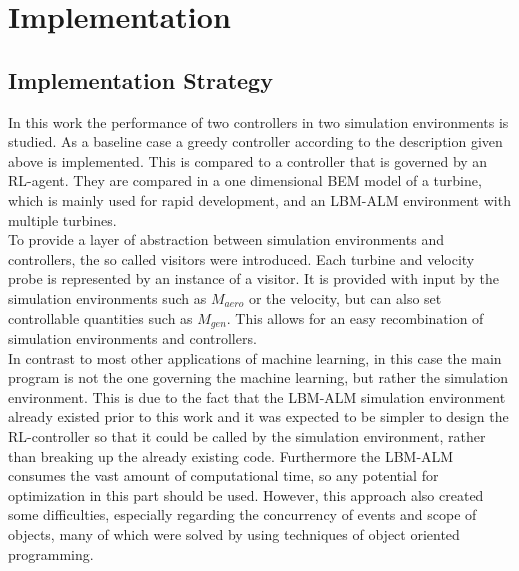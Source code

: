 \section{Implementation}
\subsection{Implementation Strategy}
In this work the performance of two controllers in two simulation environments is studied. As a baseline case a greedy controller according to the description given above is implemented. This is compared to a controller that is governed by an RL-agent. They are compared in a one dimensional BEM model of a turbine, which is mainly used for rapid development, and an LBM-ALM environment with multiple turbines. \\
To provide a layer of abstraction between simulation environments and controllers, the so called visitors were introduced. Each turbine and velocity probe is represented by an instance of a visitor. It is provided with input by the simulation environments such as $M_{aero}$ or the velocity, but can also set controllable quantities such as $M_{gen}$. This allows for an easy recombination of simulation environments and controllers. \\
In contrast to most other applications of machine learning, in this case the main program is not the one governing the machine learning, but rather the simulation environment. This is due to the fact that the LBM-ALM simulation environment already existed prior to this work and it was expected to be simpler to design the RL-controller so that it could be called by the simulation environment, rather than breaking up the already existing code. Furthermore the LBM-ALM consumes the vast amount of computational time, so any potential for optimization in this part should be used. However, this approach also created some difficulties, especially regarding the concurrency of events and scope of objects, many of which were solved by using techniques of object oriented programming.
